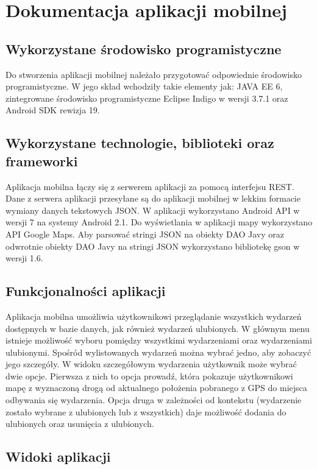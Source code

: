 \documentclass[a4paper]{article}
\begin{document}
\newpage

\section{Dokumentacja aplikacji mobilnej}

\subsection{Wykorzystane środowisko programistyczne}

Do stworzenia aplikacji mobilnej należało przygotować odpowiednie środowisko programistyczne. W jego skład wchodziły takie elementy jak:
JAVA EE 6, zintegrowane środowisko programistyczne Eclipse Indigo w wersji 3.7.1 oraz Android SDK rewizja 19.

\subsection{Wykorzystane technologie, biblioteki oraz frameworki}

Aplikacja mobilna łączy się z serwerem aplikacji za pomocą interfejsu REST. Dane z serwera aplikacji przesyłane są do aplikacji mobilnej w lekkim formacie 
wymiany danych tekstowych JSON. W aplikacji wykorzystano Android API w wersji 7 na systemy Android 2.1. Do wyświetlania w aplikacji mapy wykorzystano 
API Google Maps. Aby parsować stringi JSON na obiekty DAO Javy oraz odwrotnie obiekty DAO Javy na stringi JSON wykorzystano bibliotekę gson w wersji 1.6.

\subsection{Funkcjonalności aplikacji}

Aplikacja mobilna umożliwia użytkownikowi przeglądanie wszystkich wydarzeń dostępnych w bazie danych, jak również wydarzeń ulubionych. W głównym menu istnieje możliwość wyboru pomiędzy wszystkimi wydarzeniami oraz wydarzeniami ulubionymi. Spośród wylistowanych wydarzeń można wybrać jedno, aby zobaczyć jego szczegóły. W widoku szczegółowym wydarzenia użytkownik może wybrać dwie opcje. Pierwsza z nich to opcja prowadź, która pokazuje użytkownikowi mapę z wyznaczoną drogą od aktualnego położenia pobranego z GPS do miejsca odbywania się wydarzenia. Opcja druga w zależności od kontekstu (wydarzenie zostało wybrane z ulubionych lub z wszystkich) daje możliwość dodania do ulubionych oraz usunięcia z ulubionych.

\subsection{Widoki aplikacji}
\end{document}

